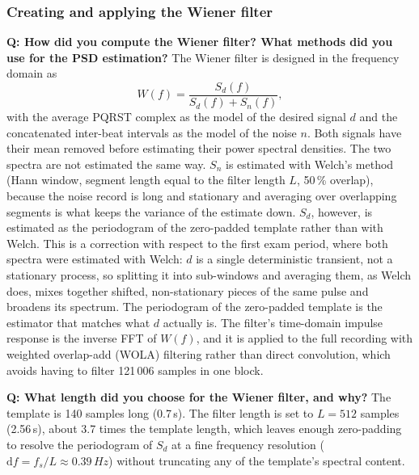 \documentclass[11pt,a4paper]{article}
\newcommand{\hertz}{Hz}
\newcommand{\second}{s}
\newcommand{\percent}{\%}
\newcommand{\num}[1]{#1}
\newcommand{\SI}[2]{#1\,#2}
\begin{document}
\subsubsection{Creating and applying the Wiener filter}

\textbf{Q: How did you compute the Wiener filter? What methods did you use for the PSD
estimation?} The Wiener filter is designed in the frequency domain as
\[
W(f) = \frac{S_d(f)}{S_d(f) + S_n(f)},
\]
with the average PQRST complex as the model of the desired signal $d$ and the concatenated
inter-beat intervals as the model of the noise $n$.
Both signals have their mean removed before estimating their power spectral densities. The two spectra are not estimated the same way. $S_n$ is estimated with Welch's
method (Hann window, segment length equal to the filter length $L$, \SI{50}{\percent} overlap),
because the noise record is long and stationary and averaging over overlapping segments is what
keeps the variance of the estimate down. $S_d$, however, is estimated as the periodogram of the
zero-padded template rather than with Welch. This is a correction with respect to the first exam
period, where both spectra were estimated with Welch: $d$ is a single deterministic transient,
not a stationary process, so splitting it into sub-windows and averaging them, as Welch does,
mixes together shifted, non-stationary pieces of the same pulse and
broadens its spectrum. The
periodogram of the zero-padded template is the estimator that matches what $d$ actually is. The
filter's time-domain impulse response is the inverse FFT of $W(f)$, and it is applied to the
full recording with weighted overlap-add (WOLA) filtering rather than direct convolution, which
avoids having to filter \num{121\,006} samples in one block.

\textbf{Q: What length did you choose for the Wiener filter, and why?} The template is
\num{140} samples long
(\SI{0.7}{\second}). The filter length is set to $L=\num{512}$ samples (\SI{2.56}{\second}),
about \num{3.7} times the template length, which leaves enough zero-padding to resolve the
periodogram of $S_d$ at a fine frequency resolution ($\mathrm{d}f = f_s/L \approx
\SI{0.39}{\hertz}$) without truncating any of the template's spectral content.

\end{document}
